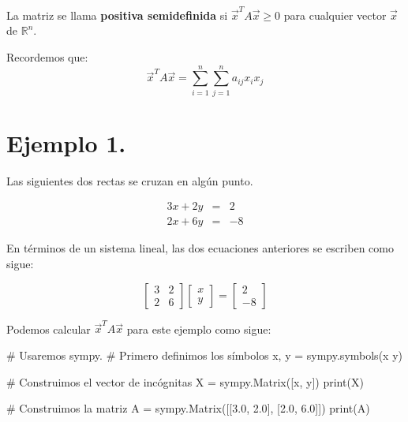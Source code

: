 \documentclass[
  letterpaper,
  DIV=11,
  numbers=noendperiod]{scrreprt}
\newenvironment{Shaded}{\begin{snugshade}}{\end{snugshade}}
\newcommand{\BuiltInTok}[1]{\textcolor[rgb]{0.00,0.23,0.31}{#1}}
\newcommand{\CommentTok}[1]{\textcolor[rgb]{0.37,0.37,0.37}{#1}}
\newcommand{\FloatTok}[1]{\textcolor[rgb]{0.68,0.00,0.00}{#1}}
\newcommand{\NormalTok}[1]{\textcolor[rgb]{0.00,0.23,0.31}{#1}}
\newcommand{\OperatorTok}[1]{\textcolor[rgb]{0.37,0.37,0.37}{#1}}
\newcommand{\StringTok}[1]{\textcolor[rgb]{0.13,0.47,0.30}{#1}}
\begin{document}
La matriz se llama \textbf{positiva semidefinida} si
\(\vec{x}^T A\vec{x} \ge 0\) para cualquier vector \(\vec{x}\) de
\(\mathbb{R}^n\).

Recordemos que: \[
\vec{x}^T A\vec{x} = \sum_{i=1}^n \sum_{j=1}^n a_{ij} x_i x_j
\]

\section{\texorpdfstring{\textbf{Ejemplo
1.}}{Ejemplo 1.}}\label{ejemplo-1.-2}

Las siguientes dos rectas se cruzan en algún punto.

\[
\begin{array}{ccc}
3x + 2y & = &2 \\
2x + 6y & = &-8
\end{array}
\]

En términos de un sistema lineal, las dos ecuaciones anteriores se
escriben como sigue:

\[
\left[
\begin{array}{cc}
3 & 2 \\
2 & 6
\end{array} \right]
\left[
\begin{array}{c}
x \\
y
\end{array} \right] =
\left[
\begin{array}{c}
2 \\ 
-8
\end{array} \right]
\tag{1}
\]

Podemos calcular \(\vec{x}^T A\vec{x}\) para este ejemplo como sigue:\\

\begin{Shaded}
\begin{Highlighting}[]
\CommentTok{\# Usaremos sympy.}
\CommentTok{\# Primero definimos los símbolos}
\NormalTok{x, y }\OperatorTok{=}\NormalTok{ sympy.symbols(}\StringTok{\textquotesingle{}x y\textquotesingle{}}\NormalTok{)}

\CommentTok{\# Construimos el vector de incógnitas}
\NormalTok{X }\OperatorTok{=}\NormalTok{ sympy.Matrix([x, y])}
\BuiltInTok{print}\NormalTok{(X)}

\CommentTok{\# Construimos la matriz}
\NormalTok{A }\OperatorTok{=}\NormalTok{ sympy.Matrix([[}\FloatTok{3.0}\NormalTok{, }\FloatTok{2.0}\NormalTok{], [}\FloatTok{2.0}\NormalTok{, }\FloatTok{6.0}\NormalTok{]])}
\BuiltInTok{print}\NormalTok{(A)}
\end{Highlighting}
\end{Shaded}
\end{document}
